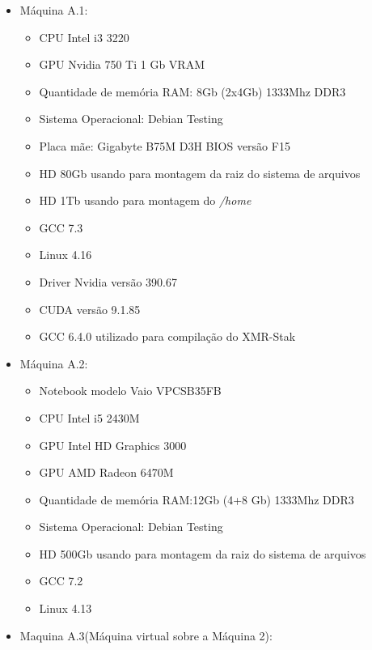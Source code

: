\begin{itemize}

\item Máquina A.1:%
\begin{itemize}
	\item \acrshort{CPU} Intel i3 3220
	\item \acrshort{GPU} Nvidia 750 Ti 1 Gb VRAM
	\item Quantidade de memória \acrshort{RAM}: 8Gb (2x4Gb) 1333Mhz DDR3
	\item Sistema Operacional: Debian Testing
	\item Placa mãe: Gigabyte B75M D3H BIOS versão F15
	\item HD 80Gb usando para montagem da raiz do sistema de arquivos 
	\item HD 1Tb usando para montagem do \textit{/home}
	\item GCC 7.3
	\item Linux 4.16
	\item Driver Nvidia versão 390.67
	\item CUDA versão 9.1.85
	\item GCC 6.4.0 utilizado para compilação do XMR-Stak
\end{itemize}

\item Máquina A.2:%

\begin{itemize}
	\item Notebook modelo Vaio VPCSB35FB
	\item \acrshort{CPU} Intel i5 2430M
	\item \acrshort{GPU} Intel HD Graphics 3000
	\item \acrshort{GPU} AMD Radeon 6470M
	\item Quantidade de memória \acrshort{RAM}:12Gb (4+8 Gb) 1333Mhz DDR3
	\item Sistema Operacional: Debian Testing
	\item HD 500Gb usando para montagem da raiz do sistema de arquivos 
	\item GCC 7.2
	\item Linux 4.13
\end{itemize}

\item Maquina A.3(Máquina virtual sobre a Máquina 2):%


\end{itemize}
